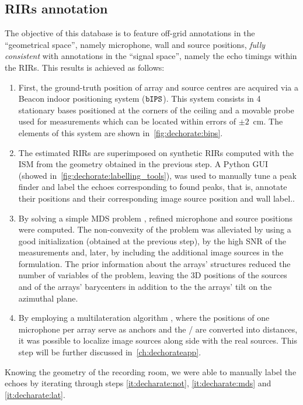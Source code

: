 \subsection{RIRs annotation}
The objective of this database is to feature off-grid annotations in the ``geometrical space'', namely microphone, wall and source positions, \textit{fully consistent} with annotations in the ``signal space'', namely the echo timings within the \acp{RIR}.
This results is achieved as follows:
\begin{enumerate}[label=(\roman*)]
    \item \label{it:decharate:ips} First, the ground-truth position of array and source centres are acquired via a Beacon indoor positioning system ($\mathtt{bIPS}$).
    This system consists in 4 stationary bases positioned at the corners of the ceiling and a movable probe used for measurements which can be located within errors of $\pm2$~cm.
    The elements of this system are shown in~\cref{fig:dechorate:bips}.
    \item \label{it:decharate:not} The estimated \acp{RIR} are superimposed on synthetic \acp{RIR} computed with the \acf{ISM} from the geometry obtained in the previous step.
    A Python GUI (showed in~\cref{fig:dechorate:labelling_tools}), was used to manually tune a peak finder and label the echoes corresponding to found peaks, that is, annotate their positions and their corresponding image source position and wall label..

    \item \label{it:decharate:mds} By solving a simple \acf{MDS} problem , refined microphone and source positions were computed.
    The non-convexity of the problem was alleviated by using a good initialization (obtained at the previous step), by the high SNR of the measurements and, later, by including the additional image sources in the formulation.
    The prior information about the arrays' structures reduced the number of variables of the problem, leaving the 3D positions of the sources and of the arrays' barycenters in addition to the the arrays' tilt on the azimuthal plane.

    \item \label{it:decharate:lat} By employing a multilateration algorithm , where the positions of one microphone per array serve as anchors and the \TOAs/ are converted into distances, it was possible to localize image sources along side with the real sources.
    This step will be further discussed in~\cref{ch:dechorateapp}.
\end{enumerate}
Knowing the geometry of the recording room, we were able to manually label the echoes by iterating through steps \ref{it:decharate:not}, \ref{it:decharate:mds} and \ref{it:decharate:lat}.

